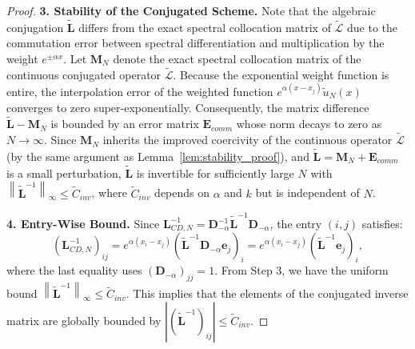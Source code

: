 \documentclass[pdflatex,sn-mathphys-num]{sn-jnl}%
\theoremstyle{thmstyleone}%
\newcommand{\norm}[1]{\left\lVert#1\right\rVert}
\newcommand{\mat}[1]{\mathbf{#1}}
\begin{document}
\begin{proof}
\noindent\textbf{3. Stability of the Conjugated Scheme.}
Note that the algebraic conjugation $\widetilde{\mat{L}}$ differs from the exact spectral collocation matrix of $\widetilde{\mathcal{L}}$ due to the commutation error between spectral differentiation and multiplication by the weight $e^{\pm \alpha x}$. Let $\mat{M}_N$ denote the exact spectral collocation matrix of the continuous conjugated operator $\widetilde{\mathcal{L}}$. Because the exponential weight function is entire, the interpolation error of the weighted function $e^{\alpha(x-x_j)} \tilde{u}_N(x)$ converges to zero super-exponentially. Consequently, the matrix difference $\widetilde{\mat{L}} - \mat{M}_N$ is bounded by an error matrix $\mat{E}_{comm}$ whose norm decays to zero as $N \to \infty$. Since $\mat{M}_N$ inherits the improved coercivity of the continuous operator $\widetilde{\mathcal{L}}$ (by the same argument as Lemma~\ref{lem:stability_proof}), and $\widetilde{\mat{L}} = \mat{M}_N + \mat{E}_{comm}$ is a small perturbation, $\widetilde{\mat{L}}$ is invertible for sufficiently large $N$ with $\norm{\widetilde{\mat{L}}^{-1}}_\infty \le \tilde{C}_{inv}$, where $\tilde{C}_{inv}$ depends on $\alpha$ and $k$ but is independent of $N$.

\noindent\textbf{4. Entry-Wise Bound.}
Since $\mat{L}_{CD,N}^{-1} = \mat{D}_{-\alpha}^{-1} \widetilde{\mat{L}}^{-1} \mat{D}_{-\alpha}$, the entry $(i,j)$ satisfies:
\begin{equation} (\mat{L}_{CD,N}^{-1})_{ij} = e^{\alpha(x_i - x_j)} (\widetilde{\mat{L}}^{-1} \mat{D}_{-\alpha} \mat{e}_j)_i = e^{\alpha(x_i - x_j)} (\widetilde{\mat{L}}^{-1} \mat{e}_j)_i, \end{equation}
where the last equality uses $(\mat{D}_{-\alpha})_{jj} = 1$. From Step 3, we have the uniform bound $\norm{\widetilde{\mat{L}}^{-1}}_\infty \le \tilde{C}_{inv}$. This implies that the elements of the conjugated inverse matrix are globally bounded by $|(\widetilde{\mat{L}}^{-1})_{ij}| \le \tilde{C}_{inv}$.


\end{proof}
\end{document}
